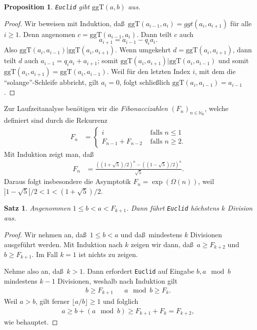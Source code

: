 \documentclass[10pt,reqno]{amsart}
\numberwithin{equation}{section}
\newcommand\ggt{\ggT}
\newcommand\ggT{\mathrm{ggT}}
\newcommand\NN{\mathbb N}
\newtheorem{theorem}[definition]{Satz}
\newtheorem{proposition}[definition]{Proposition}
\begin{document}
\begin{proposition}\label{prop_euclid}
	{\tt Euclid} gibt $\ggt(a,b)$ aus. %
\end{proposition}
\begin{proof}
	Wir beweisen mit Induktion, da\ss\ $\ggt(a_{i-1},a_{i})=ggt(a_{i},a_{i+1})$ f\"ur alle $i\geq1$.
	Denn angenomen $c=\ggt(a_{i-1},a_i)$.
	Dann teilt $c$ auch
		$$a_{i+1}=a_{i-1}-q_ia_i.$$
	Also $\ggt(a_i,a_{i-1})|\ggt(a_i,a_{i+1})$.
	Wenn umgekehrt $d=\ggt(a_i,a_{i+1})$, dann teilt $d$ auch $a_{i-1}=q_ia_i+a_{i+1}$; somit $\ggt(a_i,a_{i+1})|\ggt(a_i,a_{i-1})$ und somit $\ggt(a_i,a_{i+1})=\ggt(a_i,a_{i-1})$.
	Weil f\"ur den letzten Index $i$, mit dem die ``solange''-Schleife abbricht, gilt $a_i=0$, folgt schlie\ss lich $\ggt(a_i,a_{i-1})=a_{i-1}$.
\end{proof}

Zur Laufzeitanalyse ben\"otigen wir die {\em Fibonaccizahlen} $(F_n)_{n\in\NN_0}$, welche definiert sind durch die Rekurrenz
\begin{align*}
	F_n&=\begin{cases}i&\mbox{ falls }n\leq1\\F_{n-1}+F_{n-2}&\mbox{ falls }n\geq2.\end{cases}
\end{align*}
Mit Induktion zeigt man, da\ss
\begin{align}\label{eq_golden}
	F_n&=\frac{((1+\sqrt5)/2)^n-((1-\sqrt5)/2)^n}{\sqrt5}.
\end{align}
Daraus folgt insbesondere die Asymptotik $F_n=\exp(\Omega(n))$, weil $|1-\sqrt5|/2<1<(1+\sqrt5)/2$.

\begin{theorem}\label{thm_euclid}
	Angenommen $1\leq b<a<F_{k+1}$.
	Dann f\"uhrt {\tt Euclid} h\"ochstens $k$ Division aus.
\end{theorem}
\begin{proof}
	Wir nehmen an, da\ss\ $1\leq b<a$ und da\ss\ mindestens $k$ Divisionen ausgef\"uhrt werden.
	Mit Induktion nach $k$ zeigen wir dann, da\ss\ $a\geq F_{k+2}$ und $b\geq F_{k+1}$.
	Im Fall $k=1$ ist nichts zu zeigen.

	Nehme also an, da\ss\ $k>1$.
	Dann erfordert {\tt Euclid} auf Eingabe $b,a\mod b$ mindestens $k-1$ Divisionen, weshalb nach Induktion gilt
	\begin{align*}
		b\geq F_{k+1}&&a\mod b\geq F_{k}.
	\end{align*}
	Weil $a>b$, gilt ferner $\lfloor a/b\rfloor\geq1$ und folglich
	\begin{align*}
		a\geq b+(a\mod b)\geq F_{k+1}+F_k=F_{k+2},
	\end{align*}
	wie behauptet.
\end{proof}
\end{document}
